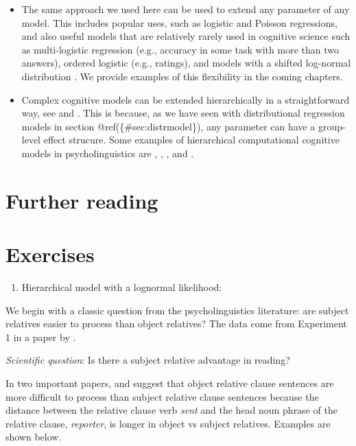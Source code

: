 \documentclass[12pt,]{krantz}
\providecommand{\tightlist}{%
  \setlength{\itemsep}{0pt}\setlength{\parskip}{0pt}}
\theoremstyle{definition}
\theoremstyle{definition}
\theoremstyle{definition}
\theoremstyle{remark}
\begin{document}
\begin{itemize}
\item
  The same approach we used here can be used to extend any parameter of any
  model. This includes popular uses, such as logistic and Poisson regressions, and also useful models that are relatively rarely used in cognitive science such as multi-logistic regression (e.g., accuracy in some task with more than two answers), ordered logistic (e.g., ratings), and models with a shifted log-normal distribution \citep[see][]{NicenboimEtAl2016Frontiersb, Rouder2005}. We provide examples of this flexibility in the coming chapters.
\item
  Complex cognitive models can be extended hierarchically in a straightforward way, see \citet{Lee2011} and \citet{LeeWagenmakers2014}. This is because, as we have seen with distributional regression models in section @ref(\{\#sec:distrmodel\}), any parameter can have a group-level effect strucure. Some examples of hierarchical computational cognitive models in psycholinguistics are \citet{LogacevVasishth2015}, \citet{nicenboimModelsRetrievalSentence2018}, \citet{VasishthEtAl2017Modelling}, and \citet{VasishthEtAl2017Feature}.
\end{itemize}

\hypertarget{further-reading-4}{%
\section{Further reading}\label{further-reading-4}}

\hypertarget{exercises-4}{%
\section{Exercises}\label{exercises-4}}

\begin{enumerate}
\def\labelenumi{\arabic{enumi}.}
\setcounter{enumi}{2}
\tightlist
\item
  Hierarchical model with a lognormal likelihood:
\end{enumerate}

We begin with a classic question from the psycholinguistics literature: are subject relatives easier to process than object relatives? The data come from Experiment 1 in a paper by \citet{grodner}.

\emph{Scientific question}: Is there a subject relative advantage in reading?

In two important papers, \citet{gibson00} and \citet{grodner} suggest that object relative clause sentences are more difficult to process than subject relative clause sentences because the distance between the relative clause verb \emph{sent} and the head noun phrase of the relative clause, \emph{reporter}, is longer in object vs subject relatives. Examples are shown below.
\end{document}
